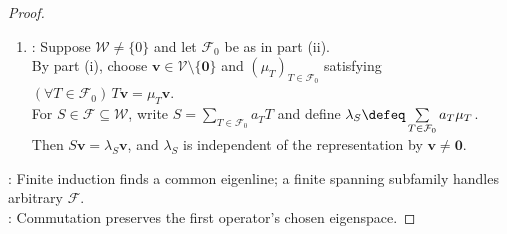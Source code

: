 \begin{theorem}
\begin{proof}
\begin{enumerate}[label=(\roman*)]
\item {}: Suppose $\mathcal{W}\neq\{0\}$ and let $\mathcal{F}_0$ be as in part (ii).\\
By part (i), choose $\mathbf{v}\in\mathcal{V}\setminus\{\mathbf{0}\}$ and $(\mu_T)_{T\in\mathcal{F}_0}$ satisfying $(\forall T\in\mathcal{F}_0)\,T\mathbf{v}=\mu_T\mathbf{v}$.\\
For $S\in\mathcal{F}\subseteq\mathcal{W}$, write $S=\sum\limits_{T\in\mathcal{F}_0}a_TT$ and define $\lambda_S\defeq\sum\limits_{T\in\mathcal{F}_0}a_T\mu_T$.\\
Then $S\mathbf{v}=\lambda_S\mathbf{v}$, and $\lambda_S$ is independent of the representation by $\mathbf{v}\neq\mathbf{0}$.
\end{enumerate}
: Finite induction finds a common eigenline; a finite spanning subfamily handles arbitrary $\mathcal{F}$.\\
: Commutation preserves the first operator's chosen eigenspace.
\end{proof}
\end{theorem}

